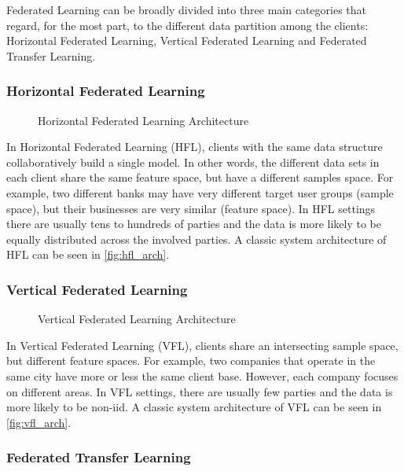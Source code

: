 Federated Learning can be broadly divided into three main categories \cite{10.1145/3298981, 10.1145/3412357} that regard, for the most part, to the different data partition among the clients: Horizontal Federated Learning, Vertical Federated Learning and Federated Transfer Learning.

\subsubsection{Horizontal Federated Learning}

\begin{figure}
    \centering
    \caption{Horizontal Federated Learning Architecture}
    \label{fig:hfl_arch}
\end{figure}

In Horizontal Federated Learning (HFL), clients with the same data structure collaboratively build a single model. In other words, the different data sets in each client share the same feature space, but have a different samples space. For example, two different banks may have very different target user groups (sample space), but their businesses are very similar (feature space). In HFL settings there are usually tens to hundreds of parties and the data is more likely to be equally distributed across the involved parties. A classic system architecture of HFL can be seen in \autoref{fig:hfl_arch}.

\subsubsection{Vertical Federated Learning}

\begin{figure}
    \centering
    \caption{Vertical Federated Learning Architecture}
    \label{fig:vfl_arch}
\end{figure}

In Vertical Federated Learning (VFL), clients share an intersecting sample space, but different feature spaces. For example, two companies that operate in the same city have more or less the same client base. However, each company focuses on different areas. In VFL settings, there are usually few parties and the data is more likely to be non-iid. A classic system architecture of VFL can be seen in \autoref{fig:vfl_arch}.

\subsubsection{Federated Transfer Learning}

